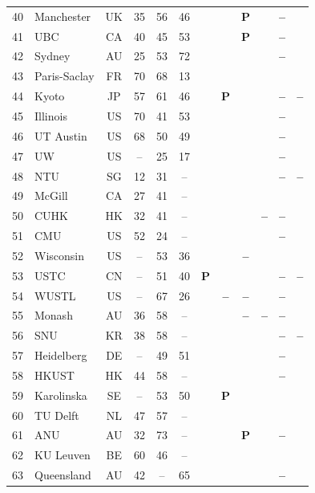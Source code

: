 \documentclass[11pt,a4paper]{article}
\newcommand{\si}{\ding{51}}
\newcommand{\no}{\textcolor{gris}{\textbf{--}}}
\newcommand{\pc}{\textbf{P}}
\begin{document}
\begin{longtable}{@{}r l c c c c c c c c c c@{}}
	40 & Manchester & UK & 35 & 56 & 46 & \si & \si & \pc & \si & \no & \si \\
	41 & UBC & CA & 40 & 45 & 53 & \si & \si & \pc & \si & \no & \si \\
	42 & Sydney & AU & 25 & 53 & 72 & \si & \si & \si & \si & \no & \si \\
	43 & Paris-Saclay & FR & 70 & 68 & 13 & \si & \si & \si & \si & \si & \si \\
	44 & Kyoto & JP & 57 & 61 & 46 & \si & \pc & \si & \si & \no & \no \\
	45 & Illinois & US & 70 & 41 & 53 & \si & \si & \si & \si & \no & \si \\
	46 & UT Austin & US & 68 & 50 & 49 & \si & \si & \si & \si & \no & \si \\
	47 & UW & US & -- & 25 & 17 & \si & \si & \si & \si & \no & \si \\
	48 & NTU & SG & 12 & 31 & -- & \si & \si & \si & \si & \no & \no \\
	49 & McGill & CA & 27 & 41 & -- & \si & \si & \si & \si & \si & \si \\
	50 & CUHK & HK & 32 & 41 & -- & \si & \si & \si & \no & \no & \si \\
	51 & CMU & US & 52 & 24 & -- & \si & \si & \si & \si & \no & \si \\
	52 & Wisconsin & US & -- & 53 & 36 & \si & \si & \no & \si & \si & \si \\
	53 & USTC & CN & -- & 51 & 40 & \pc & \si & \si & \si & \no & \no \\
	54 & WUSTL & US & -- & 67 & 26 & \si & \no & \no & \si & \no & \si \\
	55 & Monash & AU & 36 & 58 & -- & \si & \si & \no & \no & \no & \si \\
	56 & SNU & KR & 38 & 58 & -- & \si & \si & \si & \si & \no & \no \\
	57 & Heidelberg & DE & -- & 49 & 51 & \si & \si & \si & \si & \no & \si \\
	58 & HKUST & HK & 44 & 58 & -- & \si & \si & \si & \si & \no & \si \\
	59 & Karolinska & SE & -- & 53 & 50 & \si & \pc & \si & \si & \si & \si \\
	60 & TU Delft & NL & 47 & 57 & -- & \si & \si & \si & \si & \si & \si \\
	61 & ANU & AU & 32 & 73 & -- & \si & \si & \pc & \si & \no & \si \\
	62 & KU Leuven & BE & 60 & 46 & -- & \si & \si & \si & \si & \si & \si \\
	63 & Queensland & AU & 42 & -- & 65 & \si & \si & \si & \si & \no & \si \\
\end{longtable}
\normalsize
\end{document}
